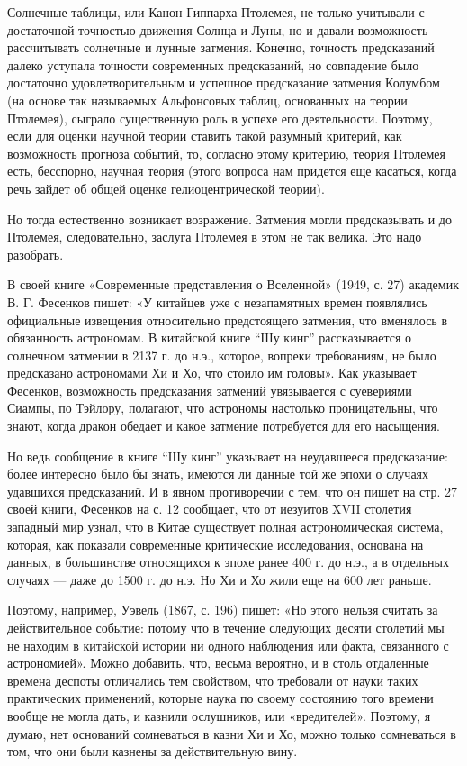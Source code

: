 Солнечные таблицы, или Канон Гиппарха-Птолемея, не только
учитывали с достаточной точностью движения Солнца и Луны, но и давали
возможность рассчитывать солнечные и лунные затмения. Конечно,
точность предсказаний далеко уступала точности современных
предсказаний, но совпадение было достаточно удовлетворительным и
успешное предсказание затмения Колумбом (на основе так называемых
Альфонсовых таблиц, основанных на теории Птолемея), сыграло
существенную роль в успехе его деятельности. Поэтому, если для оценки
научной теории ставить такой разумный критерий, как возможность
прогноза событий, то, согласно этому критерию, теория Птолемея есть,
бесспорно, научная теория (этого вопроса нам придется еще касаться,
когда речь зайдет об общей оценке гелиоцентрической теории).

Но тогда естественно возникает возражение. Затмения могли
предсказывать и до Птолемея, следовательно, заслуга Птолемея в этом не
так велика. Это надо разобрать.

В своей книге «Современные представления о Вселенной» (1949, с. 27)
академик В. Г. Фесенков пишет: «У китайцев уже с незапамятных времен
появлялись официальные извещения относительно предстоящего затмения,
что вменялось в обязанность астрономам. В китайской книге ``Шу кинг''
рассказывается о солнечном затмении в 2137 г. до н.э., которое,
вопреки требованиям, не было предсказано астрономами Хи и Хо, что
стоило им головы». Как указывает Фесенков, возможность предсказания
затмений увязывается с суевериями Сиампы, по Тэйлору, полагают, что
астрономы настолько проницательны, что знают, когда дракон обедает и
какое затмение потребуется для его насыщения.

Но ведь сообщение в книге ``Шу кинг'' указывает на неудавшееся
предсказание: более интересно было бы знать, имеются ли данные той же
эпохи о случаях удавшихся предсказаний. И в явном противоречии с тем,
что он пишет на стр. 27 своей книги, Фесенков на с. 12 сообщает, что
от иезуитов XVII столетия западный мир узнал, что в Китае существует
полная астрономическая система, которая, как показали современные
критические исследования, основана на данных, в большинстве
относящихся к эпохе ранее 400 г. до н.э., а в отдельных случаях ---
даже до 1500 г. до н.э. Но Хи и Хо жили еще на 600 лет раньше.

Поэтому, например, Уэвель (1867, с. 196) пишет: «Но этого нельзя
считать за действительное событие: потому что в течение следующих
десяти столетий мы не находим в китайской истории ни одного наблюдения
или факта, связанного с астрономией». Можно добавить, что, весьма
вероятно, и в столь отдаленные времена деспоты отличались тем
свойством, что требовали от науки таких практических применений,
которые наука по своему состоянию того времени вообще не могла дать, и
казнили ослушников, или «вредителей». Поэтому, я думаю, нет оснований
сомневаться в казни Хи и Хо, можно только сомневаться в том, что они
были казнены за действительную вину.


